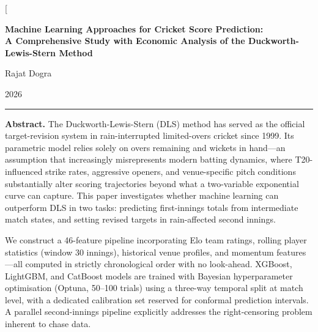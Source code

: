 \documentclass[10pt,a4paper,twocolumn]{article}
\begin{document}
\twocolumn[{%
\begin{center}
{\LARGE\bfseries Machine Learning Approaches for Cricket Score Prediction:\\[2pt]
A Comprehensive Study with Economic Analysis of the Duckworth-Lewis-Stern Method}

\vspace{0.8em}

{\large Rajat Dogra}

\vspace{0.3em}

{\normalsize 2026}
\end{center}

\vspace{0.6em}
\noindent\rule{\linewidth}{0.4pt}
\smallskip

\noindent\textbf{Abstract.}
The Duckworth-Lewis-Stern (DLS) method has served as the official target-revision system in rain-interrupted limited-overs cricket since 1999. Its parametric model relies solely on overs remaining and wickets in hand---an assumption that increasingly misrepresents modern batting dynamics, where T20-influenced strike rates, aggressive openers, and venue-specific pitch conditions substantially alter scoring trajectories beyond what a two-variable exponential curve can capture. This paper investigates whether machine learning can outperform DLS in two tasks: predicting first-innings totals from intermediate match states, and setting revised targets in rain-affected second innings.

We construct a 46-feature pipeline incorporating Elo team ratings, rolling player statistics (window 30 innings), historical venue profiles, and momentum features---all computed in strictly chronological order with no look-ahead. XGBoost, LightGBM, and CatBoost models are trained with Bayesian hyperparameter optimisation (Optuna, 50--100 trials) using a three-way temporal split at match level, with a dedicated calibration set reserved for conformal prediction intervals. A parallel second-innings pipeline explicitly addresses the right-censoring problem inherent to chase data.

}
\end{document}
